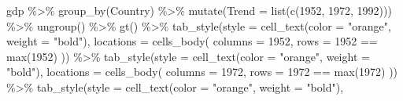 \documentclass[
]{book}
\newenvironment{Shaded}{\begin{snugshade}}{\end{snugshade}}
\newcommand{\AttributeTok}[1]{\textcolor[rgb]{0.77,0.63,0.00}{#1}}
\newcommand{\FunctionTok}[1]{\textcolor[rgb]{0.00,0.00,0.00}{#1}}
\newcommand{\NormalTok}[1]{#1}
\newcommand{\SpecialCharTok}[1]{\textcolor[rgb]{0.00,0.00,0.00}{#1}}
\newcommand{\StringTok}[1]{\textcolor[rgb]{0.31,0.60,0.02}{#1}}
\begin{document}
\begin{Shaded}
\begin{Highlighting}[]
\NormalTok{gdp }\SpecialCharTok{\%\textgreater{}\%} 
  \FunctionTok{group\_by}\NormalTok{(Country) }\SpecialCharTok{\%\textgreater{}\%} 
  \FunctionTok{mutate}\NormalTok{(}\AttributeTok{Trend =} \FunctionTok{list}\NormalTok{(}\FunctionTok{c}\NormalTok{(}\StringTok{\textasciigrave{}}\AttributeTok{1952}\StringTok{\textasciigrave{}}\NormalTok{, }\StringTok{\textasciigrave{}}\AttributeTok{1972}\StringTok{\textasciigrave{}}\NormalTok{, }\StringTok{\textasciigrave{}}\AttributeTok{1992}\StringTok{\textasciigrave{}}\NormalTok{))) }\SpecialCharTok{\%\textgreater{}\%} 
  \FunctionTok{ungroup}\NormalTok{() }\SpecialCharTok{\%\textgreater{}\%} 
  \FunctionTok{gt}\NormalTok{() }\SpecialCharTok{\%\textgreater{}\%} 
  \FunctionTok{tab\_style}\NormalTok{(}\AttributeTok{style =} \FunctionTok{cell\_text}\NormalTok{(}\AttributeTok{color =} \StringTok{"orange"}\NormalTok{,}
                              \AttributeTok{weight =} \StringTok{"bold"}\NormalTok{),}
            \AttributeTok{locations =} \FunctionTok{cells\_body}\NormalTok{(}
              \AttributeTok{columns =} \StringTok{\textasciigrave{}}\AttributeTok{1952}\StringTok{\textasciigrave{}}\NormalTok{,}
              \AttributeTok{rows =} \StringTok{\textasciigrave{}}\AttributeTok{1952}\StringTok{\textasciigrave{}} \SpecialCharTok{==} \FunctionTok{max}\NormalTok{(}\StringTok{\textasciigrave{}}\AttributeTok{1952}\StringTok{\textasciigrave{}}\NormalTok{)}
\NormalTok{            )) }\SpecialCharTok{\%\textgreater{}\%} 
  \FunctionTok{tab\_style}\NormalTok{(}\AttributeTok{style =} \FunctionTok{cell\_text}\NormalTok{(}\AttributeTok{color =} \StringTok{"orange"}\NormalTok{,}
                              \AttributeTok{weight =} \StringTok{"bold"}\NormalTok{),}
            \AttributeTok{locations =} \FunctionTok{cells\_body}\NormalTok{(}
              \AttributeTok{columns =} \StringTok{\textasciigrave{}}\AttributeTok{1972}\StringTok{\textasciigrave{}}\NormalTok{,}
              \AttributeTok{rows =} \StringTok{\textasciigrave{}}\AttributeTok{1972}\StringTok{\textasciigrave{}} \SpecialCharTok{==} \FunctionTok{max}\NormalTok{(}\StringTok{\textasciigrave{}}\AttributeTok{1972}\StringTok{\textasciigrave{}}\NormalTok{)}
\NormalTok{            )) }\SpecialCharTok{\%\textgreater{}\%} 
  \FunctionTok{tab\_style}\NormalTok{(}\AttributeTok{style =} \FunctionTok{cell\_text}\NormalTok{(}\AttributeTok{color =} \StringTok{"orange"}\NormalTok{,}
                              \AttributeTok{weight =} \StringTok{"bold"}\NormalTok{),}

\end{Highlighting}
\end{Shaded}
\end{document}
